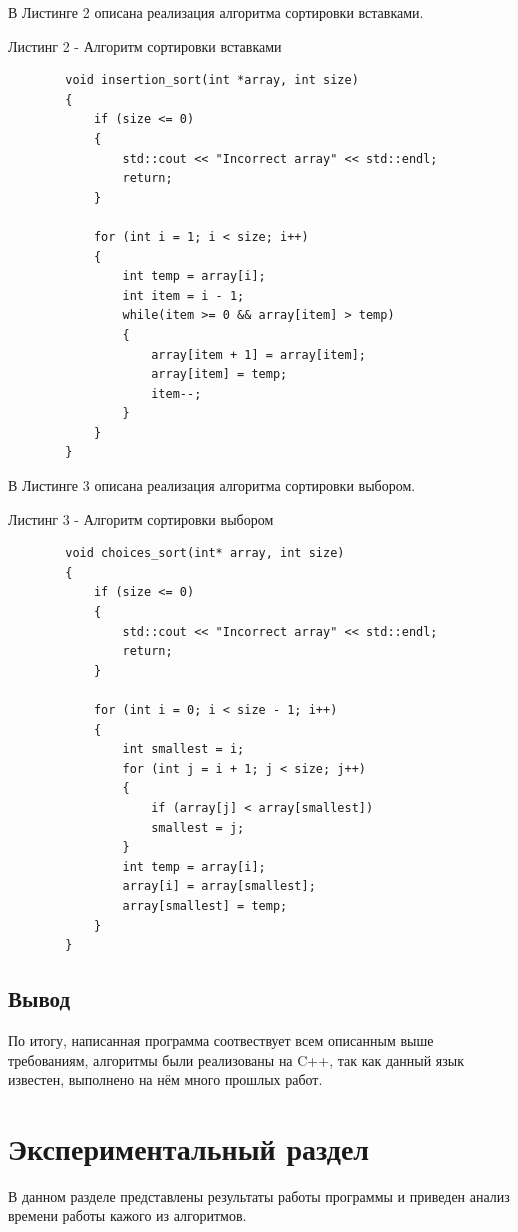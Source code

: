 \documentclass[14pt, a4paper]{extarticle}
\begin{document}
	В Листинге 2 описана реализация алгоритма сортировки вставками.
	
	Листинг 2 - Алгоритм сортировки вставками
	\begin{lstlisting}	
		void insertion_sort(int *array, int size)
		{
			if (size <= 0)
			{
				std::cout << "Incorrect array" << std::endl;
				return;
			}
			
			for (int i = 1; i < size; i++)
			{
				int temp = array[i];
				int item = i - 1;
				while(item >= 0 && array[item] > temp)
				{
					array[item + 1] = array[item];
					array[item] = temp;
					item--;
				}
			}
		}	
	\end{lstlisting}
	\newpage
	
	В Листинге 3 описана реализация алгоритма сортировки выбором.
	
	Листинг 3 - Алгоритм сортировки выбором
	\begin{lstlisting}
		void choices_sort(int* array, int size)
		{
			if (size <= 0)
			{
				std::cout << "Incorrect array" << std::endl;
				return;
			}
			
			for (int i = 0; i < size - 1; i++)
			{
				int smallest = i;
				for (int j = i + 1; j < size; j++)
				{
					if (array[j] < array[smallest])
					smallest = j;
				}
				int temp = array[i];
				array[i] = array[smallest];
				array[smallest] = temp;
			}
		}		
	\end{lstlisting}
	\newpage
	
	\subsection*{Вывод}
	По итогу, написанная программа соотвествует всем описанным выше требованиям, алгоритмы были реализованы на C++, так как данный язык известен, выполнено на нём много прошлых работ. 
	
	\clearpage
	\section{Экспериментальный раздел}
	В данном разделе представлены результаты работы программы и приведен анализ времени работы кажого из алгоритмов.
	
\end{document}
